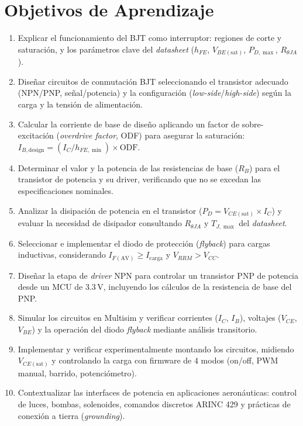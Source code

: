 \documentclass[11pt]{article}
\begin{document}
\section{Objetivos de Aprendizaje}
\begin{enumerate}
  \item Explicar el funcionamiento del BJT como interruptor: regiones de corte y
        saturación, y los parámetros clave del \emph{datasheet}
        ($h_{FE}$, $V_{BE(\text{sat})}$, $P_{D,\max}$, $R_{\theta JA}$).
  \item Diseñar circuitos de conmutación BJT seleccionando el transistor adecuado
        (NPN/PNP, señal/potencia) y la configuración (\emph{low-side}/\emph{high-side})
        según la carga y la tensión de alimentación.
  \item Calcular la corriente de base de diseño aplicando un factor de sobre-excitación
        (\emph{overdrive factor}, ODF) para asegurar la saturación:
        $I_{B,\text{design}} = (I_C/h_{FE,\min})\times\text{ODF}$.
  \item Determinar el valor y la potencia de las resistencias de base ($R_B$) para el
        transistor de potencia y su driver, verificando que no se excedan las
        especificaciones nominales.
  \item Analizar la disipación de potencia en el transistor
        ($P_D = V_{CE(\text{sat})}\times I_C$) y evaluar la necesidad de disipador
        consultando $R_{\theta JA}$ y $T_{J,\max}$ del \emph{datasheet}.
  \item Seleccionar e implementar el diodo de protección (\emph{flyback}) para cargas
        inductivas, considerando $I_{F(\text{AV})}\ge I_\text{carga}$ y
        $V_{RRM} > V_{CC}$.
  \item Diseñar la etapa de \emph{driver} NPN para controlar un transistor PNP de
        potencia desde un MCU de 3.3\,V, incluyendo los cálculos de la resistencia de
        base del PNP.
  \item Simular los circuitos en Multisim y verificar corrientes ($I_C$, $I_B$),
        voltajes ($V_{CE}$, $V_{BE}$) y la operación del diodo \emph{flyback} mediante
        análisis transitorio.
  \item Implementar y verificar experimentalmente montando los circuitos, midiendo
        $V_{CE(\text{sat})}$ y controlando la carga con firmware de 4 modos
        (on/off, PWM manual, barrido, potenciómetro).
  \item Contextualizar las interfaces de potencia en aplicaciones aeronáuticas: control
        de luces, bombas, solenoides, comandos discretos ARINC 429 y prácticas de
        conexión a tierra (\emph{grounding}).
\end{enumerate}
\end{document}
